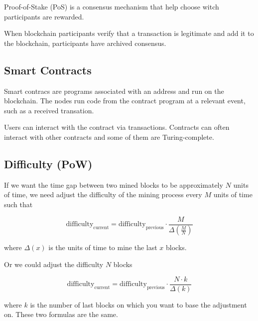 \documentclass{article}
\begin{document}
Proof-of-Stake (PoS) is a consensus mechanism that help choose witch participants
are rewarded.

When blockchain participants verify that a transaction is legitimate and add it
to the blockchain, participants have archived consensus.

\subsection{Smart Contracts}

Smart contracs are programs associated with an address and run on the blockchain.
The nodes run code from the contract program at a relevant event, such as a received transation.

Users can interact with the contract via transactions. Contracts can often interact with other contracts
and some of them are Turing-complete.

%
%

\subsection{Difficulty (PoW)}

If we want the time gap between two mined blocks to be approximately
\(N\) units of time, we need adjust the difficulty of the mining process every 
\(M\) units of time such that

\[
    \text{difficulty}_\text{current} =
    \text{difficulty}_\text{previous}
    \cdot \frac{M}{\Delta (\frac{M}{N})}
\]

where \(\Delta (x)\) is the units of time to mine the last \(x\) blocks.

Or we could adjust the difficulty \(N\) blocks

\[
    \text{difficulty}_\text{current} =
    \text{difficulty}_\text{previous}
    \cdot \frac{N \cdot k}{\Delta(k)}
\]

where \(k\) is the number of last blocks on which you want to
base the adjustment on. These two formulas are the same.
\end{document}
